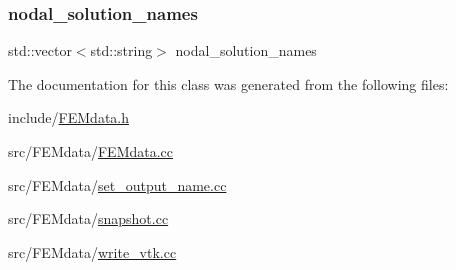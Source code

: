 \mbox{\label{class_f_e_mdata_a7b00177ad21830fe46a5bf4b1b4a3ea5}} 
\subsubsection{\texorpdfstring{nodal\+\_\+solution\+\_\+names}{nodal\_solution\_names}}
{\footnotesize\ttfamily std\+::vector$<$std\+::string$>$ nodal\+\_\+solution\+\_\+names}



The documentation for this class was generated from the following files\+:\begin{DoxyCompactItemize}
\item 
include/\mbox{\hyperlink{_f_e_mdata_8h}{F\+E\+Mdata.\+h}}\item 
src/\+F\+E\+Mdata/\mbox{\hyperlink{_f_e_mdata_8cc}{F\+E\+Mdata.\+cc}}\item 
src/\+F\+E\+Mdata/\mbox{\hyperlink{set__output__name_8cc}{set\+\_\+output\+\_\+name.\+cc}}\item 
src/\+F\+E\+Mdata/\mbox{\hyperlink{snapshot_8cc}{snapshot.\+cc}}\item 
src/\+F\+E\+Mdata/\mbox{\hyperlink{write__vtk_8cc}{write\+\_\+vtk.\+cc}}\end{DoxyCompactItemize}
